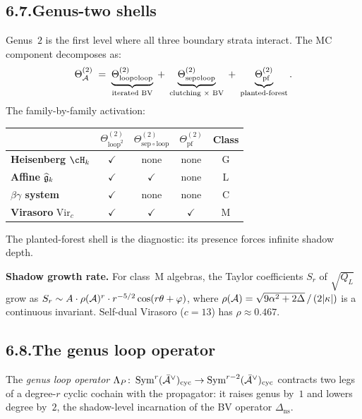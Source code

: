 \subsection*{6.7.\enspace Genus-two shells}

Genus~$2$ is the first level where all three boundary
strata interact. The MC component decomposes as:
\[
\Theta^{(2)}_\cA
\;=\;
\underbrace{\Theta^{(2)}_{\mathrm{loop}\circ\mathrm{loop}}}_{%
\text{iterated BV}}
\;+\;
\underbrace{\Theta^{(2)}_{\mathrm{sep}\circ\mathrm{loop}}}_{%
\text{clutching $\times$ BV}}
\;+\;
\underbrace{\Theta^{(2)}_{\mathrm{pf}}}_{%
\text{planted-forest}}.
\]
The family-by-family activation:

\begin{center}
\renewcommand{\arraystretch}{1.2}
\begin{tabular}{lcccc}
& $\Theta^{(2)}_{\mathrm{loop}^2}$
& $\Theta^{(2)}_{\mathrm{sep}\circ\mathrm{loop}}$
& $\Theta^{(2)}_{\mathrm{pf}}$
& \textbf{Class}\\
\hline
\textbf{Heisenberg} $\cH_k$
 & $\checkmark$ & none & none & G\\
\textbf{Affine} $\widehat{\mathfrak{g}}_k$
 & $\checkmark$ & $\checkmark$ & none & L\\
\textbf{$\beta\gamma$ system}
 & $\checkmark$ & none & none & C\\
\textbf{Virasoro} $\mathrm{Vir}_c$
 & $\checkmark$ & $\checkmark$ & $\checkmark$ & M
\end{tabular}
\end{center}

\noindent
The planted-forest shell is the diagnostic: its presence forces
infinite shadow depth.

\medskip

\noindent\textbf{Shadow growth rate.}\enspace
For class~M algebras, the Taylor coefficients $S_r$ of
$\sqrt{Q_L}$ grow as
$S_r \sim A\cdot\rho(\mathcal{A})^r\cdot r^{-5/2}
\cos(r\theta+\varphi)$,
where
$\rho(\mathcal{A}) = \sqrt{9\alpha^2+2\Delta}\,/\,(2|\kappa|)$
is a continuous invariant. Self-dual Virasoro ($c=13$) has
$\rho\approx 0.467$.

\subsection*{6.8.\enspace The genus loop operator}

The \emph{genus loop operator}
$\Lambda_P\colon\operatorname{Sym}^r(\bar{\mathcal{A}}^\vee)_{\mathrm{cyc}}
\to\operatorname{Sym}^{r-2}(\bar{\mathcal{A}}^\vee)_{\mathrm{cyc}}$ contracts
two legs of a degree-$r$ cyclic cochain with the propagator:
it raises genus by~$1$ and lowers degree by~$2$, the shadow-level
incarnation of the BV operator $\Delta_{\mathrm{ns}}$.

